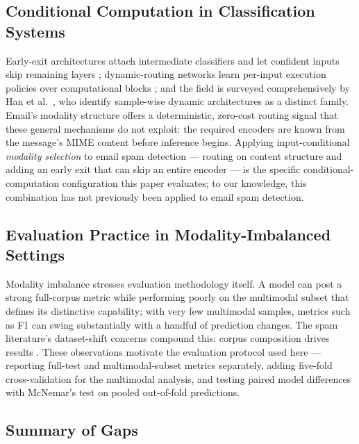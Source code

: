 \documentclass[10pt,twoside]{article}
\begin{document}
\subsection{Conditional Computation in Classification Systems}\label{sec:rw-conditional}

Early-exit architectures attach intermediate classifiers and let confident inputs skip remaining layers \citep{teerapittayanon2016branchynet}; dynamic-routing networks learn per-input execution policies over computational blocks \citep{wang2018skipnet}; and the field is surveyed comprehensively by Han et al.\ \citep{han2022dynamicsurvey}, who identify sample-wise dynamic architectures as a distinct family. Email's modality structure offers a deterministic, zero-cost routing signal that these general mechanisms do not exploit: the required encoders are known from the message's MIME content before inference begins. Applying input-conditional \emph{modality selection} to email spam detection --- routing on content structure and adding an early exit that can skip an entire encoder --- is the specific conditional-computation configuration this paper evaluates; to our knowledge, this combination has not previously been applied to email spam detection.

\subsection{Evaluation Practice in Modality-Imbalanced Settings}\label{sec:rw-evaluation}

Modality imbalance stresses evaluation methodology itself. A model can post a strong full-corpus metric while performing poorly on the multimodal subset that defines its distinctive capability; with very few multimodal samples, metrics such as F1 can swing substantially with a handful of prediction changes. The spam literature's dataset-shift concerns compound this: corpus composition drives results \citep{janez2023review}. These observations motivate the evaluation protocol used here --- reporting full-test and multimodal-subset metrics separately, adding five-fold cross-validation for the multimodal analysis, and testing paired model differences with McNemar's test \citep{mcnemar1947note} on pooled out-of-fold predictions.

\subsection{Summary of Gaps}\label{sec:rw-gaps}
\end{document}

